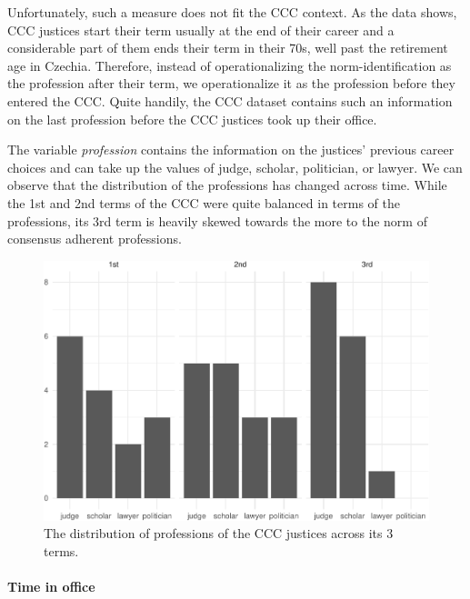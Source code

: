 \documentclass[
  11pt,
]{article}
\begin{document}
Unfortunately, such a measure does not fit the CCC context. As the data
shows, CCC justices start their term usually at the end of their career
and a considerable part of them ends their term in their 70s, well past
the retirement age in Czechia. Therefore, instead of operationalizing
the norm-identification as the profession after their term, we
operationalize it as the profession before they entered the CCC. Quite
handily, the CCC dataset contains such an information on the last
profession before the CCC justices took up their office.

The variable \emph{profession} contains the information on the justices'
previous career choices and can take up the values of judge, scholar,
politician, or lawyer. We can observe that the distribution of the
professions has changed across time. While the 1st and 2nd terms of the
CCC were quite balanced in terms of the professions, its 3rd term is
heavily skewed towards the more to the norm of consensus adherent
professions.

\begin{figure}
\centering
\includegraphics{separate_opinions_files/figure-latex/unnamed-chunk-5-1.pdf}
\caption{The distribution of professions of the CCC justices across its
3 terms.}
\end{figure}

\hypertarget{time-in-office}{%
\paragraph{Time in office}\label{time-in-office}}
\end{document}
